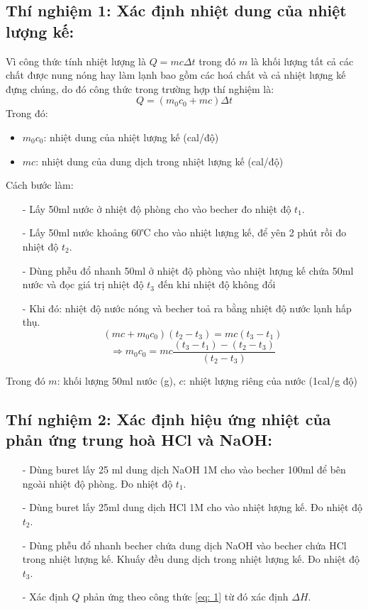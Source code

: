 \documentclass[12pt,a4paper]{report}
\begin{document}
\subsection*{Thí nghiệm 1: Xác định nhiệt dung của nhiệt lượng kế:}

Vì công thức tính nhiệt lượng là $Q = mc\Delta t$ trong đó $m$ là khối lượng tất cả các chất được nung nóng hay làm lạnh bao gồm các hoá chất và cả nhiệt lượng kế đựng chúng, do đó công thức trong trường hợp thí nghiệm là:
\begin{equation} \label{eq: 1}
    Q = (m_0 c_0 + mc)\Delta t
\end{equation}
Trong đó:
\begin{itemize}
    \item $m_0 c_0$: nhiệt dung của nhiệt lượng kế (cal/độ)
    \item $mc$: nhiệt dung của dung dịch trong nhiệt lượng kế (cal/độ)
\end{itemize}
Cách bước làm:
\begin{itemize}
    \item[-] Lấy 50ml nước ở nhiệt độ phòng cho vào becher đo nhiệt độ $t_1$.
    \item[-] Lấy 50ml nước khoảng 60℃ cho vào nhiệt lượng kế, để yên 2 phút rồi đo nhiệt độ $t_2$.
    \item[-] Dùng phễu đổ nhanh 50ml ở nhiệt độ phòng vào nhiệt lượng kế chứa 50ml nước và đọc giá trị nhiệt độ $t_3$ đến khi nhiệt độ không đổi
    \item[-] Khi đó: nhiệt độ nước nóng và becher toả ra bằng nhiệt độ nước lạnh hấp thụ.
    \[ (mc + m_0 c_0)(t_2-t_3) = mc(t_3-t_1) \]
    \[ \Rightarrow m_{0} c_0 = mc \frac{(t_3-t_1)-(t_2-t_3)}{(t_2-t_3)} \]
\end{itemize}
Trong đó $m$: khối lượng 50ml nước (g), $c$: nhiệt lượng riêng của nước (1cal/g độ)

\subsection*{Thí nghiệm 2: Xác định hiệu ứng nhiệt của phản ứng trung hoà HCl và NaOH:}

\begin{itemize}
    \item[-] Dùng buret lấy 25 ml dung dịch NaOH 1M cho vào becher 100ml để bên ngoài nhiệt độ phòng. Đo nhiệt độ $t_1$.
    \item[-] Dùng buret lấy 25ml dung dịch HCl 1M cho vào nhiệt lượng kế. Đo nhiệt độ $t_2$.
    \item[-] Dùng phễu đổ nhanh becher chứa dung dịch NaOH vào becher chứa HCl trong nhiệt lượng kế. Khuấy đều dung dịch trong nhiệt lượng kế. Đo nhiệt độ $t_3$.
    \item[-] Xác định $Q$ phản ứng theo công thức \ref{eq: 1} từ đó xác định $\Delta H$.
\end{itemize}
\end{document}
